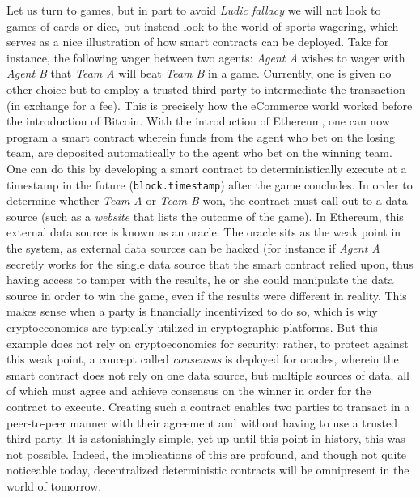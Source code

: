 \documentclass{article}
\begin{document}
Let us turn to games, but in part to avoid \textit{Ludic fallacy} we will not look to games of cards or dice, but instead look to the world of sports wagering, which serves as a nice illustration of how smart contracts can be deployed. Take for instance, the following wager between two agents: \textit{Agent A} wishes to wager with \textit{Agent B} that \textit{Team A} will beat \textit{Team B} in a game. Currently, one is given no other choice but to employ a trusted third party to intermediate the transaction (in exchange for a fee). This is precisely how the eCommerce world worked before the introduction of Bitcoin. With the introduction of Ethereum, one can now program a smart contract wherein funds from the agent who bet on the losing team, are deposited automatically to the agent who bet on the winning team. One can do this by developing a smart contract to deterministically execute at a timestamp in the future (\texttt{block.timestamp}) after the game concludes. In order to determine whether \textit{Team A} or \textit{Team B} won, the contract must call out to a data source (such as a \textit{website} that lists the outcome of the game). In Ethereum, this external data source is known as an \gls{oracle}. The oracle sits as the weak point in the system, as external data sources can be hacked (for instance if \textit{Agent A} secretly works for the single data source that the smart contract relied upon, thus having access to tamper with the results, he or she could manipulate the data source in order to win the game, even if the results were different in reality. This makes sense when a party is financially incentivized to do so, which is why cryptoeconomics are typically utilized in cryptographic platforms. But this example does not rely on cryptoeconomics for security; rather, to protect against this weak point, a concept called \textit{consensus} is deployed for oracles, wherein the smart contract does not rely on one data source, but multiple sources of data, all of which must agree and achieve consensus on the winner in order for the contract to execute. Creating such a contract enables two parties to transact in a peer-to-peer manner with their agreement and without having to use a trusted third party. It is astonishingly simple, yet up until this point in history, this was not possible. Indeed, the implications of this are profound, and though not quite noticeable today, decentralized deterministic contracts will be omnipresent in the world of tomorrow.
\end{document}
